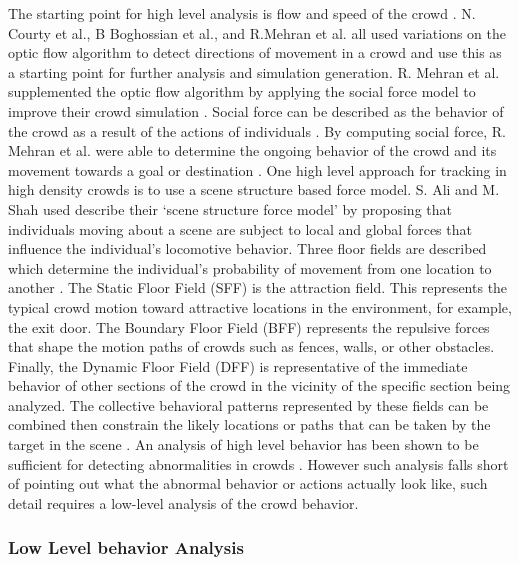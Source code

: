 \documentclass[12pt, onecolumn, conference]{IEEEtran}
\begin{document}
The starting point for high level analysis is flow and speed of the crowd \cite{N. Courty}\cite{B. Boghossian}\cite{R. Mehran}. N. Courty et al., B Boghossian et al., and R.Mehran et al. all used variations on the optic flow algorithm to detect directions of movement in a crowd and use this as a starting point for further analysis and simulation generation. R. Mehran et al. supplemented the optic flow algorithm by applying the social force model to improve their crowd simulation \cite{R. Mehran}. Social force can be described as the behavior of the crowd as a result of the actions of individuals \cite{R. Mehran}. By computing social force, R. Mehran et al. were able to determine the ongoing behavior of the crowd and its movement towards a goal or destination \cite{R. Mehran}. 
One high level approach for tracking in high density crowds is to use a scene structure based force model\cite{S. Ali}. S. Ali and M. Shah used describe their ‘scene structure force model’ by proposing that individuals moving about a scene are subject to local and global forces that influence the individual’s locomotive behavior. Three floor fields are described which determine the individual’s probability of movement from one location to another \cite{S. Ali}. The Static Floor Field (SFF) is the attraction field. This represents the typical crowd motion toward attractive locations in the environment, for example, the exit door. The Boundary Floor Field (BFF) represents the repulsive forces that shape the motion paths of crowds such as fences, walls, or other obstacles. Finally, the Dynamic Floor Field (DFF) is representative of the immediate behavior of other sections of the crowd in the vicinity of the specific section being analyzed. The collective behavioral patterns represented by these fields can be combined then constrain the likely locations or paths that can be taken by the target in the scene \cite{S. Ali}. 
An analysis of high level behavior has been shown to be sufficient for detecting abnormalities in crowds \cite{R. Mehran}\cite{F. Zhao}. However such analysis falls short of pointing out what the abnormal behavior or actions actually look like, such detail requires a low-level analysis of the crowd behavior.

\subsubsection{Low Level behavior Analysis}
\end{document}
